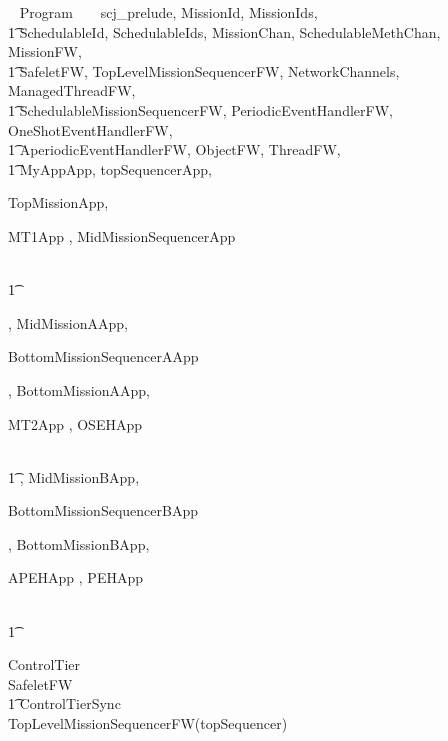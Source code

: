 
%
\begin{zsection}
  \SECTION ~ Program ~ \parents ~ scj\_prelude, MissionId, MissionIds, \\
  \t1 SchedulableId, SchedulableIds, MissionChan, SchedulableMethChan, MissionFW,\\
  \t1 SafeletFW, TopLevelMissionSequencerFW, NetworkChannels, ManagedThreadFW, \\
  \t1 SchedulableMissionSequencerFW, PeriodicEventHandlerFW, OneShotEventHandlerFW,\\
  \t1 AperiodicEventHandlerFW, ObjectFW, ThreadFW, \\
  \t1 MyAppApp, topSequencerApp,

TopMissionApp,

MT1App
	,
MidMissionSequencerApp
	
\\ \t1
	
	,
MidMissionAApp,

BottomMissionSequencerAApp
	
	
	,
BottomMissionAApp,

MT2App
	,
OSEHApp
	
\\ \t1
	,
MidMissionBApp,

BottomMissionSequencerBApp
	
	
	,
BottomMissionBApp,

APEHApp
	,
PEHApp
	
\\ \t1
	
	
\end{zsection}
%
\begin{circus}
\circprocess ControlTier \circdef \\
\circblockopen
SafeletFW \\
\t1 \lpar ControlTierSync \rpar \\
TopLevelMissionSequencerFW(topSequencer)
\circblockclose
\end{circus}
%


